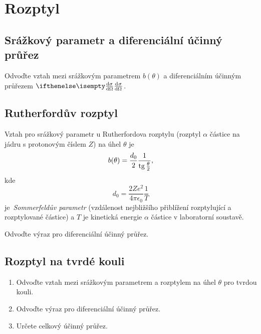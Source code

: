\section{Rozptyl}
\subsection{Srážkový parametr a diferenciální účinný průřez}
    Odvoďte vztah mezi srážkovým parametrem $b(\theta)$ a diferenciálním účinným průřezem $\derivative{\sigma}{\Omega}$.

\subsection{Rutherfordův rozptyl}
    Vztah pro srážkový parametr u Rutherfordova rozptylu (rozptyl $\alpha$ částice na jádru s protonovým číslem $Z$) na úhel $\theta$ je
    \begin{equation}
        b(\theta)=\frac{d_{0}}{2}\frac{1}{\operatorname{tg}{\frac{\theta}{2}}},
    \end{equation}
    kde
    \begin{equation}
        d_{0}=\frac{2Ze^{2}}{4\pi\epsilon_{0}}\frac{1}{T}
    \end{equation}
    je~\emph{Sommerfeldův parametr} (vzdálenost nejbližšího přiblížení rozptylující a rozptylované částice) a $T$ je kinetická energie $\alpha$ částice v laboratorní soustavě.

    Odvoďte výraz pro diferenciální účinný průřez.

\subsection{Rozptyl na tvrdé kouli}
    \begin{enumerate}
        \item Odvoďte vztah mezi srážkovým parametrem a rozptylem na úhel $\theta$ pro tvrdou kouli.
        \item Odvoďte výraz pro diferenciální účinný průřez.
        \item Určete celkový účinný průřez.
    \end{enumerate}